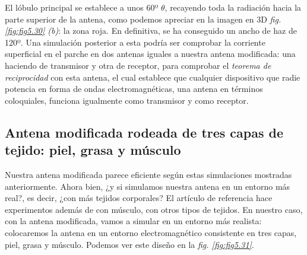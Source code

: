 El lóbulo principal se establece a unos 60º $\theta$, recayendo toda la radiación hacia la parte superior de la antena, como podemos apreciar en la imagen en 3D \textit{fig. \ref{fig:fig5.30} (b)}: la zona roja. En definitiva, se ha conseguido un ancho de haz de 120º. Una simulación posterior a esta podría ser comprobar la corriente superficial en el parche en dos antenas iguales a nuestra antena modificada: una haciendo de transmisor y otra de receptor, para comprobar el \textit{teorema de reciprocidad} con esta antena, el cual establece que cualquier dispositivo que radie potencia en forma de ondas electromagnéticas, una antena en términos coloquiales, funciona igualmente como transmisor y como receptor.

\subsection{Antena modificada rodeada de tres capas de tejido: piel, grasa y músculo}\label{subsec:3capas}

Nuestra antena modificada parece eficiente según estas simulaciones mostradas anteriormente. Ahora bien, ¿y si simulamos nuestra antena en un entorno más real?, es decir, ¿con más tejidos corporales? El artículo de referencia hace experimentos además de con músculo, con otros tipos de tejidos. En nuestro caso, con la antena modificada, vamos a simular en un entorno más realista: colocaremos la antena en un entorno electromagnético consistente en tres capas, piel, grasa y músculo. Podemos ver este diseño en la \textit{fig. \ref{fig:fig5.31}}.

